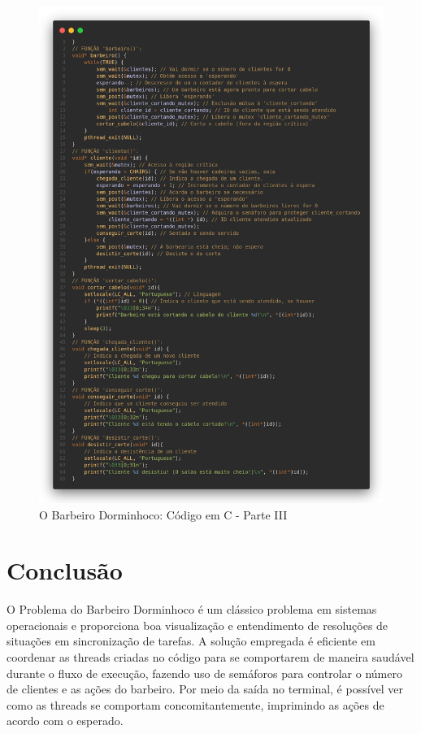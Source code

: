 \documentclass[
	12pt,				%
	openright,			%
	oneside,			%
	a4paper,			%
	chapter=TITLE,		%
	english,			%
	french,				%
	spanish,			%
	brazil				%
	]{abntex2}
\theoremstyle{definition}
\begin{document}
\begin{figure}[h]
    \centering
    \includegraphics[width=1.0\textwidth]{imagens/barbeiro_3.png}
    \caption{O Barbeiro Dorminhoco: Código em C - Parte III}
    \label{fig:barbeiro_3}
\end{figure}

\clearpage
\section{Conclusão}

O Problema do Barbeiro Dorminhoco é um clássico problema em sistemas operacionais e proporciona boa visualização e entendimento de resoluções de situações em sincronização de tarefas. A solução empregada é eficiente em coordenar as threads criadas no código para se comportarem de maneira saudável durante o fluxo de execução, fazendo uso de semáforos para controlar o número de clientes e as ações do barbeiro. Por meio da saída no terminal, é possível ver como as threads se comportam concomitantemente, imprimindo as ações de acordo com o esperado.
\end{document}
